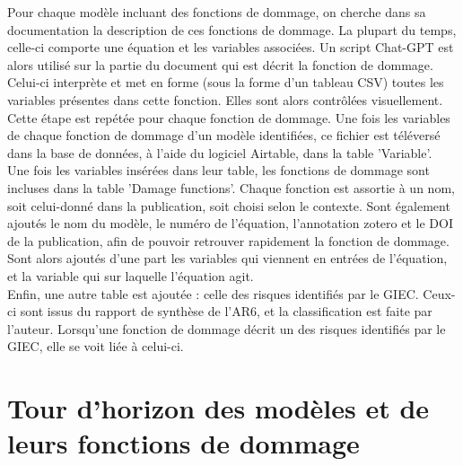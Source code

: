 \begin{methodbox}
Pour chaque modèle incluant des fonctions de dommage, on cherche dans sa documentation la description de ces fonctions de dommage. La plupart du temps, celle-ci comporte une équation et les variables associées. Un script Chat-GPT est alors utilisé sur la partie du document qui est décrit la fonction de dommage. Celui-ci interprète et met en forme (sous la forme d'un tableau CSV) toutes les variables présentes dans cette fonction. Elles sont alors contrôlées visuellement. Cette étape est repétée pour chaque fonction de dommage. Une fois les variables de chaque fonction de dommage d'un modèle identifiées, ce fichier est téléversé dans la base de données, à l'aide du logiciel Airtable, dans la table 'Variable'. \\

Une fois les variables insérées dans leur table, les fonctions de dommage sont incluses dans la table 'Damage functions'. Chaque fonction est assortie à un nom, soit celui-donné dans la publication, soit choisi selon le contexte. Sont également ajoutés le nom du modèle, le numéro de l'équation, l'annotation zotero et le DOI de la publication, afin de pouvoir retrouver rapidement la fonction de dommage. Sont alors ajoutés d'une part les variables qui viennent en entrées de l'équation, et la variable qui sur laquelle l'équation agit. \\

Enfin, une autre table est ajoutée : celle des risques identifiés par le GIEC. Ceux-ci sont issus du rapport de synthèse de l'AR6, et la classification est faite par l'auteur. Lorsqu'une fonction de dommage décrit un des risques identifiés par le GIEC, elle se voit liée à celui-ci. 



\end{methodbox}


\section{Tour d'horizon des modèles et de leurs fonctions de dommage}

